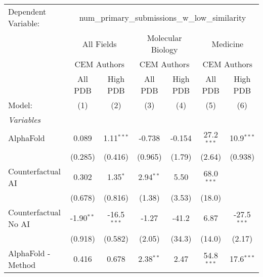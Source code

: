 \begingroup
\centering
\begin{tabular}{lcccccc}
   \tabularnewline \midrule \midrule
   Dependent Variable: & \multicolumn{6}{c}{num\_primary\_submissions\_w\_low\_similarity}\\
 & \multicolumn{2}{c}{All Fields} & \multicolumn{2}{c}{Molecular Biology} & \multicolumn{2}{c}{Medicine} \\
\cmidrule(lr){2-3} \cmidrule(lr){4-5} \cmidrule(lr){6-7}
 & \multicolumn{2}{c}{CEM Authors} & \multicolumn{2}{c}{CEM Authors} & \multicolumn{2}{c}{CEM Authors} \\
\cmidrule(lr){2-3} \cmidrule(lr){4-5} \cmidrule(lr){6-7}
 & \multicolumn{1}{c}{All PDB} & \multicolumn{1}{c}{High PDB} & \multicolumn{1}{c}{All PDB} & \multicolumn{1}{c}{High PDB} & \multicolumn{1}{c}{All PDB} & \multicolumn{1}{c}{High PDB} \\
\cmidrule(lr){2-2} \cmidrule(lr){3-3} \cmidrule(lr){4-4} \cmidrule(lr){5-5} \cmidrule(lr){6-6} \cmidrule(lr){7-7}
   Model:                                                     & (1)           & (2)           & (3)         & (4)        & (5)          & (6)\\  
   \midrule
   \emph{Variables}\\
   AlphaFold                                                  & 0.089         & 1.11$^{***}$  & -0.738      & -0.154     & 27.2$^{***}$ & 10.9$^{***}$\\   
                                                              & (0.285)       & (0.416)       & (0.965)     & (1.79)     & (2.64)       & (0.938)\\   
   Counterfactual AI                                          & 0.302         & 1.35$^{*}$    & 2.94$^{**}$ & 5.50       & 68.0$^{***}$ &   \\   
                                                              & (0.678)       & (0.816)       & (1.38)      & (3.53)     & (18.0)       &   \\   
   Counterfactual No AI                                       & -1.90$^{**}$  & -16.5$^{***}$ & -1.27       & -41.2      & 6.87         & -27.5$^{***}$\\   
                                                              & (0.918)       & (0.582)       & (2.05)      & (34.3)     & (14.0)       & (2.17)\\   
   AlphaFold - Method                                         & 0.416         & 0.678         & 2.38$^{**}$ & 2.47       & 54.8$^{***}$ & 17.6$^{***}$\\   

\end{tabular}
